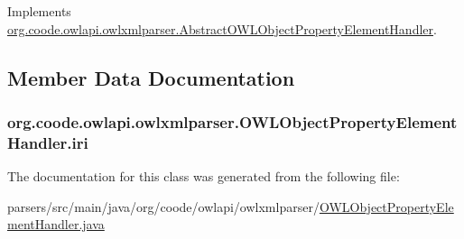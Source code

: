 Implements \hyperlink{classorg_1_1coode_1_1owlapi_1_1owlxmlparser_1_1_abstract_o_w_l_object_property_element_handler_a6346d0c788ceeba550883282c12deeb1}{org.\-coode.\-owlapi.\-owlxmlparser.\-Abstract\-O\-W\-L\-Object\-Property\-Element\-Handler}.



\subsection{Member Data Documentation}
\hypertarget{classorg_1_1coode_1_1owlapi_1_1owlxmlparser_1_1_o_w_l_object_property_element_handler_a0f000530ace36e53d1afe2480f89f970}{
\subsubsection[{iri}]{ org.\-coode.\-owlapi.\-owlxmlparser.\-O\-W\-L\-Object\-Property\-Element\-Handler.\-iri\hspace{0.3cm}{\ttfamily [private]}}}\label{classorg_1_1coode_1_1owlapi_1_1owlxmlparser_1_1_o_w_l_object_property_element_handler_a0f000530ace36e53d1afe2480f89f970}


The documentation for this class was generated from the following file\-:\begin{DoxyCompactItemize}
\item 
parsers/src/main/java/org/coode/owlapi/owlxmlparser/\hyperlink{_o_w_l_object_property_element_handler_8java}{O\-W\-L\-Object\-Property\-Element\-Handler.\-java}\end{DoxyCompactItemize}
